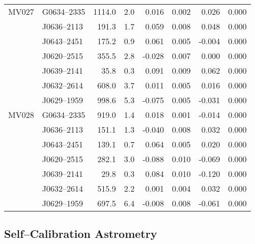 \begin{table}[h]
\begin{tabular}{llrrrrrr}
		MV027 & G0634--2335 & 1114.0  &  2.0   &   0.016  &  0.002  &  0.026  &  0.000 \\
		& J0636--2113 &  191.3  &  1.7   &   0.059  &  0.008  &  0.048  &  0.000 \\
		& J0643--2451 &  175.2  &  0.9   &   0.061  &  0.005  & -0.004  &  0.000 \\
		& J0620--2515 &  355.5  &  2.8   &  -0.028  &  0.007  &  0.000  &  0.000 \\
		& J0639--2141 &   35.8  &  0.3   &   0.091  &  0.009  &  0.062  &  0.000 \\
		& J0632--2614 &  608.0  &  3.7   &   0.011  &  0.005  &  0.016  &  0.000 \\
		& J0629--1959 &  998.6  &  5.3   &  -0.075  &  0.005  & -0.031  &  0.000 \\ \hline
		
		MV028	& G0634--2335 &  919.0  &  1.4   &   0.018  &  0.001  & -0.014  &  0.000 \\
		& J0636--2113 &  151.1  &  1.3   &  -0.040  &  0.008  &  0.032  &  0.000 \\
		& J0643--2451 &  139.1  &  0.7   &   0.064  &  0.005  &  0.020  &  0.000 \\
		& J0620--2515 &  282.1  &  3.0   &  -0.088  &  0.010  & -0.069  &  0.000 \\
		& J0639--2141 &   29.8  &  0.3   &   0.084  &  0.010  & -0.120  &  0.000 \\
		& J0632--2614 &  515.9  &  2.2   &   0.001  &  0.004  &  0.032  &  0.000 \\
		& J0629--1959 &  697.5  &  6.4   &  -0.008  &  0.008  & -0.061  &  0.000 \\ \bottomrule
	\end{tabular}
\end{table}

\clearpage
\subsection{Self--Calibration Astrometry} \label{app:sfctables}

